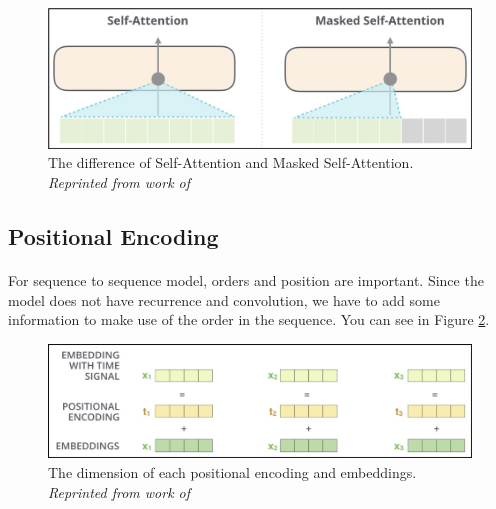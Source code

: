 \begin{figure}[H]
  \centering
  \caption[The difference of Self-Attention and Masked Self-Attention.]{The difference of Self-Attention and Masked Self-Attention. \\\hspace{\textwidth} \emph{Reprinted from work of \citeauthor{alammar_2019} \citeyear{alammar_2019}}}\label{fig:attention_6}
  \includegraphics[scale = 0.3]{figures/attention_6.jpg}  
\end{figure}
\subsection{Positional Encoding}
\paragraph{}
For sequence to sequence model, orders and position are important. Since the model does not have recurrence and convolution, we have to add some information to make use of the order in the sequence. You can see in Figure \ref{fig:attention_7}.

\begin{figure}[H]
  \centering
  \caption[The dimension of each positional encoding and embeddings.]{The dimension of each positional encoding and embeddings. \\\hspace{\textwidth} \emph{Reprinted from work of \citeauthor{alammar_2018} \citeyear{alammar_2018}}}\label{fig:attention_7}
  \includegraphics[scale = 0.4]{figures/attention_7.jpg}  
\end{figure}














\FloatBarrier